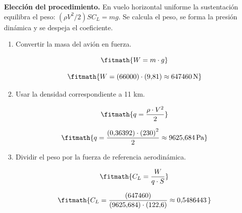 \noindent\textbf{Elección del procedimiento.} En vuelo horizontal uniforme la sustentación equilibra el peso: $(\rho V^2/2)SC_L=mg$. Se calcula el peso, se forma la presión dinámica y se despeja el coeficiente.

\begin{enumerate}

\item Convertir la masa del avión en fuerza.

\[\fitmath{W=m\cdot g}\]

\[\fitmath{W=(66000)\cdot (9{,}81)\approx 647460\,\mathrm{N}}\]

\item Usar la densidad correspondiente a 11 km.

\[\fitmath{q=\frac{\rho\cdot {V}^{2}}{2}}\]

\[\fitmath{q=\frac{(0{,}36392)\cdot {(230)}^{2}}{2}\approx 9625{,}684\,\mathrm{Pa}}\]

\item Dividir el peso por la fuerza de referencia aerodinámica.

\[\fitmath{C_L=\frac{W}{q\cdot S}}\]

\[\fitmath{C_L=\frac{(647460)}{(9625{,}684)\cdot (122{,}6)}\approx 0{,}5486443\,}\]

\end{enumerate}

